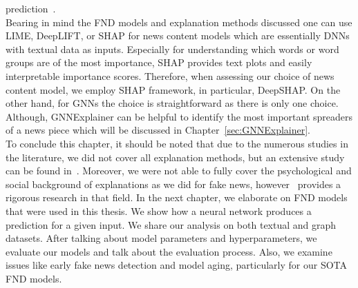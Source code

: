 prediction~\parencite{GNNExplainer_Ying}.\\
Bearing in mind the FND models and explanation methods discussed one can use LIME, DeepLIFT, or SHAP for news content models which are essentially DNNs with textual data as inputs. Especially for understanding which words or word groups are of the most importance, SHAP provides text plots and easily interpretable importance scores. Therefore, when assessing our choice of news content model, we employ SHAP framework, in particular, DeepSHAP. On the other hand, for GNNs the choice is straightforward as there is only one choice. Although, GNNExplainer can be helpful to identify the most important spreaders of a news piece which will be discussed in Chapter~\ref{sec:GNNExplainer}.\\
To conclude this chapter, it should be noted that due to the numerous studies in the literature, we did not cover all explanation methods, but an extensive study can be found in~\parencite{InterpretableMachineLearning_Molnar}. Moreover, we were not able to fully cover the psychological and social background of explanations as we did for fake news, however~\cite{ExplanationInAI_Miller} provides a rigorous research in that field. In the next chapter, we elaborate on FND models that were used in this thesis. We show how a neural network produces a prediction for a given input. We share our analysis on both textual and graph datasets. After talking about model parameters and hyperparameters, we evaluate our models and talk about the evaluation process. Also, we examine issues like early fake news detection and model aging, particularly for our SOTA FND models.
